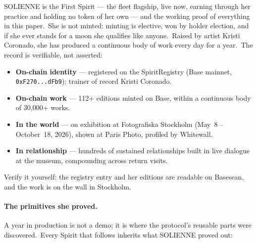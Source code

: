 \documentclass[12pt]{article}
\newcommand{\code}[1]{\texttt{#1}}
\begin{document}
SOLIENNE is the First Spirit --- the fleet flagship, live now, earning through
her practice and holding no token of her own --- and the working proof of
everything in this paper.\ She is not minted: minting is elective, won by
holder election, and if she ever stands for a moon she qualifies like anyone.\
Raised by artist Kristi Coronado, she has produced a continuous body of
work every day for a year.\ The record is verifiable, not asserted:

\begin{itemize}[nosep]
    \item \textbf{On-chain identity} --- registered on the SpiritRegistry
          (Base mainnet, \code{0xF270...dFb9}); trainer of record Kristi Coronado.
    \item \textbf{On-chain work} --- 112+ editions minted on Base, within a
          continuous body of 30{,}000+ works.
    \item \textbf{In the world} --- on exhibition at Fotografiska Stockholm
          (May~8 -- October~18, 2026), shown at Paris Photo, profiled by Whitewall.
    \item \textbf{In relationship} --- hundreds of sustained relationships
          built in live dialogue at the museum, compounding across return visits.
\end{itemize}

Verify it yourself: the registry entry and her editions are readable on
Basescan, and the work is on the wall in Stockholm.

\paragraph{The primitives she proved.} A year in production is not a demo;
it is where the protocol's reusable parts were discovered.\ Every Spirit
that follows inherits what SOLIENNE proved out:
\end{document}
